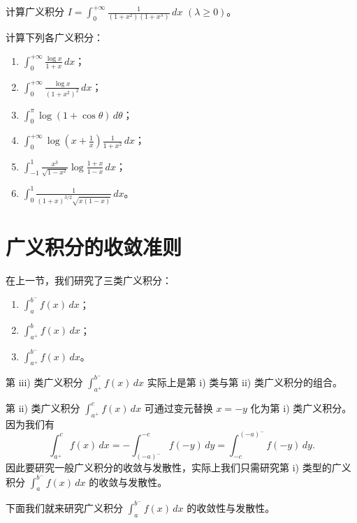 \begin{exercise}
	\item 计算广义积分 $I=\displaystyle\int_0^{+\infty}\frac{1}{(1+x^2)(1+x^{\lambda})}\,dx$ $(\lambda\geqslant0)$。
\end{exercise}

\begin{exercise}
	\item 计算下列各广义积分：
	\begin{enumerate}[label=\arabic*)]
		\item $\displaystyle\int_0^{+\infty}\frac{\log x}{1+x}\,dx$；
		\item $\displaystyle\int_0^{+\infty}\frac{\log x}{(1+x^2)^2}\,dx$；
		\item $\displaystyle\int_0^{\pi}\log(1+\cos\theta)\,d\theta$；
		\item $\displaystyle\int_0^{+\infty}\log\left(x+\frac{1}{x}\right)\frac{1}{1+x^2}\,dx$；
		\item $\displaystyle\int_{-1}^{1}\frac{x^3}{\sqrt{1-x^2}}\log\frac{1+x}{1-x}\,dx$；
		\item $\displaystyle\int_0^1\frac{1}{(1+x)^{3/2}\sqrt{x(1-x)}}\,dx$。
	\end{enumerate}
\end{exercise}

\section{广义积分的收敛准则}

在上一节，我们研究了三类广义积分：

\begin{enumerate}[label=\roman{enumi})]
\item $\displaystyle\int_a^{b^-}f(x)\,dx$；
\item $\displaystyle\int_{a^+}^bf(x)\,dx$；
\item $\displaystyle\int_{a^+}^{b^-}f(x)\,dx$。
\end{enumerate}

第 iii) 类广义积分 $\displaystyle\int_{a^+}^{b^-}f(x)\,dx$ 实际上是第 i) 类与第 ii) 类广义积分的组合。

第 ii) 类广义积分 $\displaystyle\int_{a^+}^cf(x)\,dx$ 可通过变元替换 $x=-y$ 化为第 i) 类广义积分。因为我们有
\[\int_{a^+}^cf(x)\,dx=-\int_{(-a)^-}^{-c}f(-y)\,dy=\int_{-c}^{(-a)^-}f(-y)\,dy.\]
因此要研究一般广义积分的收敛与发散性，实际上我们只需研究第 i) 类型的广义积分 $\displaystyle\int_a^{b^-}f(x)\,dx$ 的收敛与发散性。

下面我们就来研究广义积分 $\displaystyle\int_a^{b^-}f(x)\,dx$ 的收敛性与发散性。

